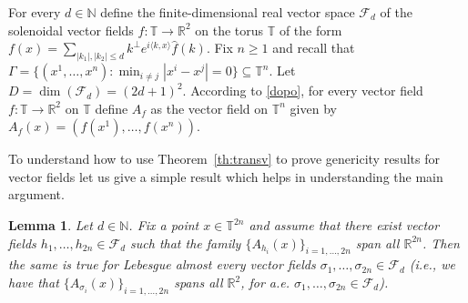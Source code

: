 \documentclass[11pt,a4paper]{article}%
\newtheorem{lemma}[theorem]{Lemma}
\begin{document}
\medskip

For every $d \in\mathbb{N}$ define the finite-dimensional real vector space
$\mathcal{F}_{d}$ of the solenoidal  vector fields $f : \mathbb{T}
\rightarrow\mathbb{R}^{2}$ on the torus $\mathbb{T}$ of the form
$
f (x) = \sum_{|k_{1} |,|k_2| \leqslant d}  k^{\bot} e^{i
\langle k, x \rangle} \hat{f} (k)
$.
Fix $n \geqslant1$ and recall that $\Gamma=\{(x^{1}, \ldots, x^{n}) : \min_{i
\neq j} |x^{i} - x^{j} | = 0\} \subseteq\mathbb{T}^{n}$.  Let $D =
\dim(\mathcal{F}_{d}) = (2d + 1)^{2}$.
According to \eqref{dopo}, for every vector field $f : \mathbb{T}
\rightarrow\mathbb{R}^{2}$ on $\mathbb{T}$ define $A_{f}$ as the vector field
on $\mathbb{T}^{n}$ given by $A_{f} (x) = (f (x^{1}), \ldots, f (x^{n}))$.

To understand how to use Theorem~\ref{th:transv}  to prove
genericity results for vector fields let us give a simple result
which helps in understanding the main argument.

\begin{lemma}
Let $d \in\mathbb{N}$. Fix a point $x \in\mathbb{T}^{2 n}$ and assume that
there exist vector fields $h_{1}, \ldots, h_{2 n} \in\mathcal{F}_{d}$ such
that the family $\{A_{h_{i}}  (x)\}_{i = 1, \ldots, 2 n}$ span all
$\mathbb{R}^{2 n}$. Then the same is true for Lebesgue almost every vector
fields $\sigma_{1}, \ldots, \sigma_{2 n} \in\mathcal{F}_{d}$ (i.e., we have
that  $\{A_{\sigma_{i}} (x)\}_{i = 1, \ldots, 2 n}$ spans all $\mathbb{R}^{2}$,
for  a.e. $\sigma_{1}, \ldots, \sigma_{2 n} \in\mathcal{F}_{d}$).
\end{lemma}
\end{document}
